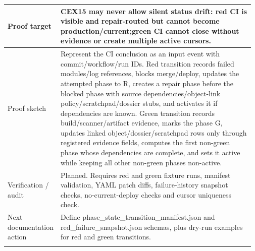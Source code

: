 \begin{longtable}{L{0.16\linewidth} L{0.81\linewidth}}
\hline\addlinespace[0.20em]
Proof target & CEX15 may never allow silent status drift: red CI is visible and repair-routed but cannot become production/\allowbreak{}current;\newline green CI cannot close without evidence or create multiple active cursors.\\
\hline\addlinespace[0.20em]
Proof sketch & Represent the CI conclusion as an input event with commit/\allowbreak{}workflow/\allowbreak{}run IDs. Red transition records failed modules/\allowbreak{}log references, blocks merge/\allowbreak{}deploy, updates the attempted phase to R, creates a repair phase before the blocked phase with source dependencies/\allowbreak{}object-link policy/\allowbreak{}scratchpad/\allowbreak{}dossier stubs, and activates it if dependencies are known. Green transition records build/\allowbreak{}scanner/\allowbreak{}artifact evidence, marks the phase G, updates linked object/\allowbreak{}dossier/\allowbreak{}scratchpad rows only through registered evidence fields, computes the first non-green phase whose dependencies are complete, and sets it active while keeping all other non-green phases non-active.\\
\hline\addlinespace[0.20em]
Verification /\allowbreak{} audit & Planned. Requires red and green fixture runs, manifest validation, YAML patch diffs, failure-history snapshot checks, no-current-deploy checks and cursor uniqueness check.\\
\hline\addlinespace[0.20em]
Next documentation action & Define phase\_state\_transition\_manifest.json and red\_failure\_snapshot.json schemas, plus dry-run examples for red and green transitions.\\
\hline\addlinespace[0.20em]
\end{longtable}
